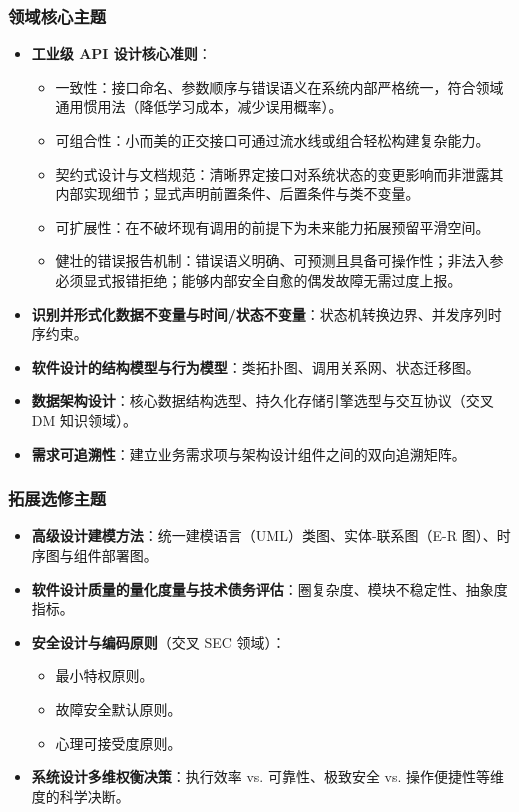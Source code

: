 \subsubsection{领域核心主题}
\begin{itemize}
    \item \textbf{工业级 API 设计核心准则}：
    \begin{itemize}
        \item 一致性：接口命名、参数顺序与错误语义在系统内部严格统一，符合领域通用惯用法（降低学习成本，减少误用概率）。
        \item 可组合性：小而美的正交接口可通过流水线或组合轻松构建复杂能力。
        \item 契约式设计与文档规范：清晰界定接口对系统状态的变更影响而非泄露其内部实现细节；显式声明前置条件、后置条件与类不变量。
        \item 可扩展性：在不破坏现有调用的前提下为未来能力拓展预留平滑空间。
        \item 健壮的错误报告机制：错误语义明确、可预测且具备可操作性；非法入参必须显式报错拒绝；能够内部安全自愈的偶发故障无需过度上报。
    \end{itemize}
    \item \textbf{识别并形式化数据不变量与时间/状态不变量}：状态机转换边界、并发序列时序约束。
    \item \textbf{软件设计的结构模型与行为模型}：类拓扑图、调用关系网、状态迁移图。
    \item \textbf{数据架构设计}：核心数据结构选型、持久化存储引擎选型与交互协议（交叉 DM 知识领域）。
    \item \textbf{需求可追溯性}：建立业务需求项与架构设计组件之间的双向追溯矩阵。
\end{itemize}

\subsubsection{拓展选修主题}
\begin{itemize}
    \item \textbf{高级设计建模方法}：统一建模语言（UML）类图、实体-联系图（E-R 图）、时序图与组件部署图。
    \item \textbf{软件设计质量的量化度量与技术债务评估}：圈复杂度、模块不稳定性、抽象度指标。
    \item \textbf{安全设计与编码原则}（交叉 SEC 领域）：
    \begin{itemize}
        \item 最小特权原则。
        \item 故障安全默认原则。
        \item 心理可接受度原则。
    \end{itemize}
    \item \textbf{系统设计多维权衡决策}：执行效率 vs. 可靠性、极致安全 vs. 操作便捷性等维度的科学决断。
\end{itemize}

